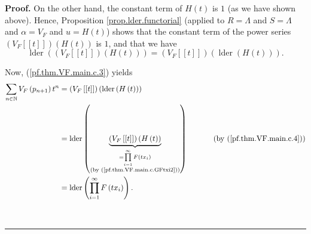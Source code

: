\documentclass[numbers=enddot,12pt,final,onecolumn,notitlepage]{scrartcl}%
\theoremstyle{definition}
\newenvironment{proof}[1][Proof]{\noindent\textbf{#1.} }{\ \rule{0.5em}{0.5em}}
\let\sumnonlimits\sum
\let\prodnonlimits\prod
\renewcommand{\sum}{\sumnonlimits\limits}
\renewcommand{\prod}{\prodnonlimits\limits}
\newenvironment{verlong}{}{}
\begin{document}
\begin{verlong}
\begin{proof}
On the other hand, the constant term of $H\left(  t\right)  $ is $1$ (as we
have shown above). Hence, Proposition \ref{prop.lder.functorial} (applied to
$R=\Lambda$ and $S=\Lambda$ and $\alpha=V_{F}$ and $u=H\left(  t\right)  $)
shows that the constant term of the power series $\left(  V_{F}\left[  \left[
t\right]  \right]  \right)  \left(  H\left(  t\right)  \right)  $ is $1$, and
that we have%
\begin{equation}
\operatorname*{lder}\left(  \left(  V_{F}\left[  \left[  t\right]  \right]
\right)  \left(  H\left(  t\right)  \right)  \right)  =\left(  V_{F}\left[
\left[  t\right]  \right]  \right)  \left(  \operatorname*{lder}\left(
H\left(  t\right)  \right)  \right)  . \label{pf.thm.VF.main.c.4}%
\end{equation}


Now, (\ref{pf.thm.VF.main.c.3}) yields%
\begin{align}
\sum_{n\in\mathbb{N}}V_{F}\left(  p_{n+1}\right)  t^{n}  &  =\left(
V_{F}\left[  \left[  t\right]  \right]  \right)  \left(  \operatorname*{lder}%
\left(  H\left(  t\right)  \right)  \right) \nonumber\\
&  =\operatorname*{lder}\left(  \underbrace{\left(  V_{F}\left[  \left[
t\right]  \right]  \right)  \left(  H\left(  t\right)  \right)  }%
_{\substack{=\prod_{i=1}^{\infty}F\left(  tx_{i}\right)  \\\text{(by
(\ref{pf.thm.VF.main.c.GFtxi2}))}}}\right)  \ \ \ \ \ \ \ \ \ \ \left(
\text{by (\ref{pf.thm.VF.main.c.4})}\right) \nonumber\\
&  =\operatorname*{lder}\left(  \prod_{i=1}^{\infty}F\left(  tx_{i}\right)
\right)  . \label{pf.thm.VF.main.c.5}%
\end{align}



\end{proof}
\end{verlong}
\end{document}
